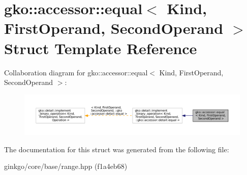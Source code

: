 \hypertarget{structgko_1_1accessor_1_1equal}{}\section{gko\+:\+:accessor\+:\+:equal$<$ Kind, First\+Operand, Second\+Operand $>$ Struct Template Reference}
\label{structgko_1_1accessor_1_1equal}


Collaboration diagram for gko\+:\+:accessor\+:\+:equal$<$ Kind, First\+Operand, Second\+Operand $>$\+:
\nopagebreak
\begin{figure}[H]
\begin{center}
\leavevmode
\includegraphics[width=350pt]{structgko_1_1accessor_1_1equal__coll__graph}
\end{center}
\end{figure}


The documentation for this struct was generated from the following file\+:\begin{DoxyCompactItemize}
\item 
ginkgo/core/base/range.\+hpp (f1a4eb68)\end{DoxyCompactItemize}
